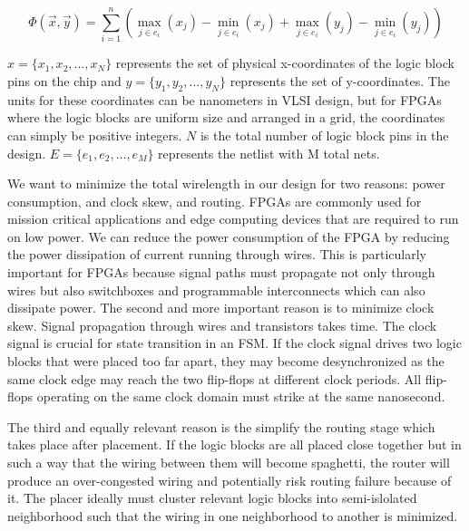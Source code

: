 \documentclass{article}
\begin{document}
    \begin{equation}
        \Phi(\vec{x}, \vec{y}) = \sum_{i=1}^{n} \left( \max_{j \in e_i} (x_j) - \min_{j \in e_i} (x_j) + \max_{j \in e_i} (y_j) - \min_{j \in e_i} (y_j) \right)
        \label{BoundingBox}
    \end{equation}

    \( x = \{ x_{1}, x_{2}, ..., x_{N} \} \) represents the set of physical x-coordinates of the logic block pins on the chip and \( y = \{ y_{1}, y_{2}, ..., y_{N} \} \) represents the set of y-coordinates.
    The units for these coordinates can be nanometers in VLSI design, but for FPGAs where the logic blocks are uniform size and arranged in a grid, the coordinates can simply be positive integers.
    \( N \) is the total number of logic block pins in the design. \( E = \{ e_{1}, e_{2}, ..., e_{M} \} \) represents the netlist with M total nets.

    We want to minimize the total wirelength in our design for two reasons: power consumption, and clock skew, and routing.
    FPGAs are commonly used for mission critical applications and edge computing devices that are required to run on low power.
    We can reduce the power consumption of the FPGA by reducing the power dissipation of current running through wires.
    This is particularly important for FPGAs because signal paths must propagate not only through wires but also switchboxes and programmable interconnects which can also dissipate power.
    The second and more important reason is to minimize clock skew. 
    Signal propagation through wires and transistors takes time. 
    The clock signal is crucial for state transition in an FSM.
    If the clock signal drives two logic blocks that were placed too far apart, they may become desynchronized as the same clock edge may reach the two flip-flops at different clock periods.
    All flip-flops operating on the same clock domain must strike at the same nanosecond.

    The third and equally relevant reason is the simplify the routing stage which takes place after placement.
    If the logic blocks are all placed close together but in such a way that the wiring between them will become spaghetti, the router will produce an over-congested wiring and potentially risk routing failure because of it. 
    The placer ideally must cluster relevant logic blocks into semi-islolated neighborhood such that the wiring in one neighborhood to another is minimized.
\end{document}
